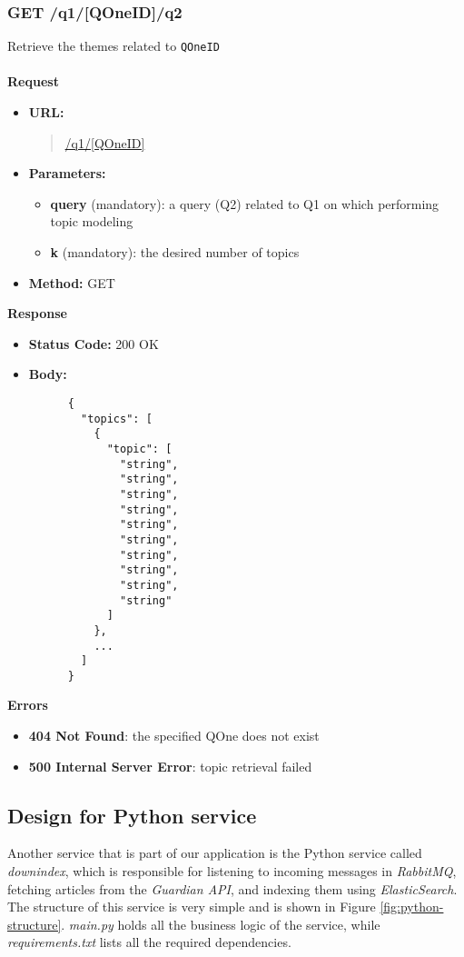\subsubsection{GET /q1/[QOneID]/q2}
Retrieve the themes related to \verb|QOneID| \\\\
\textbf{Request}
\begin{itemize}
  \item \textbf{URL:}
  \begin{quote}
    \url{/q1/[QOneID]}
  \end{quote}
  \item \textbf{Parameters:}
    \begin{itemize}
      \item \textbf{query} (mandatory): a query (Q2) related to Q1 on which performing topic modeling
      \item \textbf{k} (mandatory): the desired number of topics
    \end{itemize}
  \item \textbf{Method:} GET
\end{itemize}\leavevmode\newline
\textbf{Response}
\begin{itemize}
  \item \textbf{Status Code:} 200 OK
  \item \textbf{Body:}
    \begin{lstlisting}
      {
        "topics": [
          {
            "topic": [
              "string",
              "string",
              "string",
              "string",
              "string",
              "string",
              "string",
              "string",
              "string",
              "string"
            ]
          },
          ...
        ]
      }
    \end{lstlisting}
\end{itemize}\leavevmode\newline
\textbf{Errors}
\begin{itemize}
  \item \textbf{404 Not Found}: the specified QOne does not exist
  \item \textbf{500 Internal Server Error}: topic retrieval failed
\end{itemize}

\subsection{Design for Python service}
Another service that is part of our application is the Python service called \textit{downindex}, which is responsible for listening to incoming messages in \textit{RabbitMQ}, fetching articles from the \textit{Guardian API}, and indexing them using \textit{ElasticSearch}. The structure of this service is very simple and is shown in Figure \ref{fig:python-structure}. \textit{main.py} holds all the business logic of the service, while \textit{requirements.txt} lists all the required dependencies.

